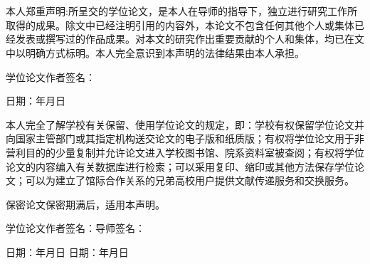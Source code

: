 \chapter*{}
\fontsize{15}{20}\selectfont
	本人郑重声明:所呈交的学位论文，是本人在导师的指导下，独立进行研究工作所取得的成果。除文中已经注明引用的内容外，本论文不包含任何其他个人或集体已经发表或撰写过的作品成果。对本文的研究作出重要贡献的个人和集体，均已在文中以明确方式标明。本人完全意识到本声明的法律结果由本人承担。

	
学位论文作者签名：

日期：\quad \quad 年\quad \quad 月\quad \quad 日

\vspace{2\baselineskip}
本人完全了解学校有关保留、使用学位论文的规定，即：学校有权保留学位论文并向国家主管部门或其指定机构送交论文的电子版和纸质版；有权将学位论文用于非营利目的的少量复制并允许论文进入学校图书馆、院系资料室被查阅；有权将学位论文的内容编入有关数据库进行检索；可以采用复印、缩印或其他方法保存学位论文；可以为建立了馆际合作关系的兄弟高校用户提供文献传递服务和交换服务。

保密论文保密期满后，适用本声明。

学位论文作者签名：\qquad  \qquad \qquad \quad 导师签名：

日期：\quad \quad 年\quad \quad 月\quad \quad 日 \qquad \qquad 日期：\quad \quad 年\quad \quad 月\quad \quad 日

\endinput
